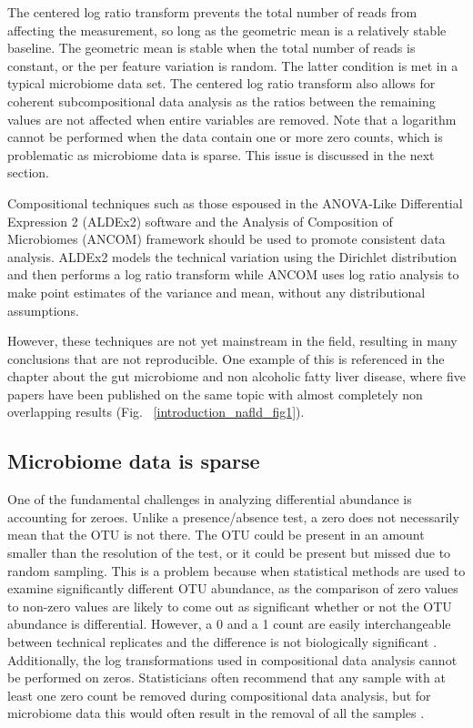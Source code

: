 The centered log ratio transform prevents the total number of reads from affecting the measurement, so long as the geometric mean is a relatively stable baseline. The geometric mean is stable when the total number of reads is constant, or the per feature variation is random. The latter condition is met in a typical microbiome data set. The centered log ratio transform also allows for coherent subcompositional data analysis as the ratios between the remaining values are not affected when entire variables are removed. Note that a logarithm cannot be performed when the data contain one or more zero counts, which is problematic as microbiome data is sparse. This issue is discussed in the next section.

Compositional techniques such as those espoused in the ANOVA-Like Differential Expression 2 (ALDEx2) software \cite{fernandes2014unifying} and the Analysis of Composition of Microbiomes (ANCOM) framework \cite{mandal2015analysis} should be used to promote consistent data analysis. ALDEx2 models the technical variation using the Dirichlet distribution and then performs a log ratio transform while ANCOM uses log ratio analysis to make point estimates of the variance and mean, without any distributional assumptions.

However, these techniques are not yet mainstream in the field, resulting in many conclusions that are not reproducible. One example of this is referenced in the chapter about the gut microbiome and non alcoholic fatty liver disease, where five papers have been published on the same topic with almost completely non overlapping results (Fig. ~\ref{introduction_nafld_fig1}).

\subsection{Microbiome data is sparse}
One of the fundamental challenges in analyzing differential abundance is accounting for zeroes. Unlike a presence/absence test, a zero does not necessarily mean that the OTU is not there. The OTU could be present in an amount smaller than the resolution of the test, or it could be present but missed due to random sampling. This is a problem because when statistical methods are used to examine significantly different OTU abundance, as the comparison of zero values to non-zero values are likely to come out as significant whether or not the OTU abundance is differential. However, a 0 and a 1 count are easily interchangeable between technical replicates and the difference is not biologically significant \cite{gloor2016s} \cite{fernandes2013anova} \cite{fernandes2014unifying}. Additionally, the log transformations used in compositional data analysis cannot be performed on zeros. Statisticians often recommend that any sample with at least one zero count be removed during compositional data analysis, but for microbiome data this would often result in the removal of all the samples \cite{aitchison1982statistical}.

